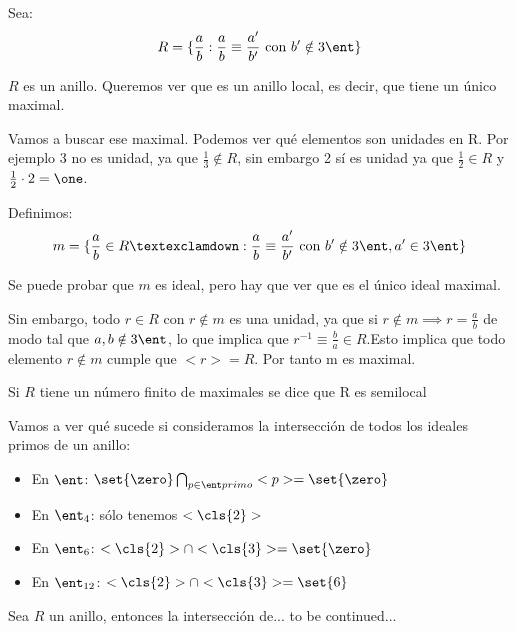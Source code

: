 \begin{example}
 Sea:
 $$ R=\{ \frac{a}{b} : \frac{a}{b}\equiv \frac{a'}{b'} \text{ con } b' \notin 3\ent \} $$
 
$R$ es un anillo. Queremos ver que es un anillo local, es decir, que tiene un único maximal.

Vamos a buscar ese maximal. Podemos ver qué elementos son unidades en R. Por ejemplo 3 no es unidad, ya que $\frac{1}{3} \notin R$, sin embargo 2 sí es unidad ya que $\frac{1}{2} \in R$ y $\frac{1}{2}\cdot 2 = \one$.

Definimos:
$$ m = \{\frac{a}{b} \in R ¡: \frac{a}{b} \equiv \frac{a'}{b'}\text{ con }b'\notin 3\ent, a' \in 3\ent \}$$

Se puede probar que $m$ es ideal, pero hay que ver que es el único ideal maximal.

Sin embargo, todo $r\in R$ con $r \notin m$ es una unidad, ya que si $r \notin m \implies r=\frac{a}{b}$ de modo tal que $a,b\notin 3\ent$, lo que implica que $r^{-1}\equiv \frac{b}{a} \in R$.Esto implica que todo elemento $r \notin m$ cumple que $<r>=R$. Por tanto m es maximal.
\end{example}

\begin{defn}
 Si $R$ tiene un número finito de maximales se dice que R es semilocal
\end{defn}

Vamos a ver qué sucede si consideramos la intersección de todos los ideales primos de un anillo:
\begin{example}
	\begin{itemize}
		\item En $\ent$: $\set{\zero} \bigcap_{p\in \ent primo}<p>=\set{\zero}$
		\item En $\ent_4$: sólo tenemos $<\cls{2}>$
		\item En $\ent_6$: $<\cls{2}>\cap<\cls{3}>=\set{\zero}$
		\item En $\ent_{12}$: $<\cls{2}>\cap<\cls{3}>=\set{6}$
	\end{itemize}
\end{example}

\begin{prop}
	Sea $R$ un anillo, entonces la intersección de... to be continued...
\end{prop}

